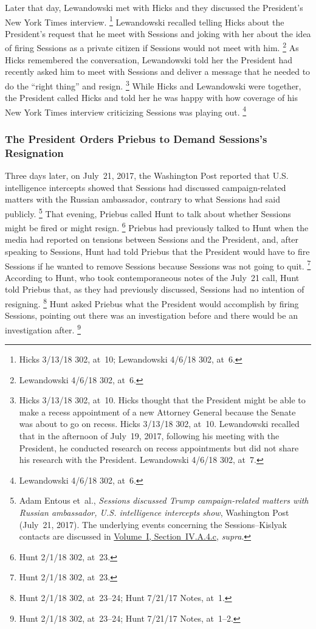 Later that day, Lewandowski met with Hicks and they discussed the President's New York Times interview.%
\footnote{Hicks 3/13/18 302, at~10;
Lewandowski 4/6/18 302, at~6.}
Lewandowski recalled telling Hicks about the President's request that he meet with Sessions and joking with her about the idea of firing Sessions as a private citizen if Sessions would not meet with him.%
\footnote{Lewandowski 4/6/18 302, at~6.}
As Hicks remembered the conversation, Lewandowski told her the President had recently asked him to meet with Sessions and deliver a message that he needed to do the ``right thing'' and resign.%
\footnote{Hicks 3/13/18 302, at~10.
Hicks thought that the President might be able to make a recess appointment of a new Attorney General because the Senate was about to go on recess.
Hicks 3/13/18 302, at~10.
Lewandowski recalled that in the afternoon of July~19, 2017, following his meeting with the President, he conducted research on recess appointments but did not share his research with the President.
Lewandowski 4/6/18 302, at~7.}
While Hicks and Lewandowski were together, the President called Hicks and told her he was happy with how coverage of his New York Times interview criticizing Sessions was playing out.%
\footnote{Lewandowski 4/6/18 302, at~6.}

\subsubsection{The President Orders Priebus to Demand Sessions's Resignation}

Three days later, on July~21, 2017, the Washington Post reported that U.S. intelligence intercepts showed that Sessions had discussed campaign-related matters with the Russian ambassador, contrary to what Sessions had said publicly.%
\footnote{Adam Entous et~al., \textit{Sessions discussed Trump campaign-related matters with Russian ambassador, U.S. intelligence intercepts show}, Washington Post (July~21, 2017).
The underlying events concerning the Sessions--Kislyak contacts are discussed in \hyperlink{paragraph.1.4.1.4.3}{Volume~I, Section~IV.A.4.c}, \textit{supra}.}
That evening, Priebus called Hunt to talk about whether Sessions might be fired or might resign.%
\footnote{Hunt 2/1/18 302, at~23.}
Priebus had previously talked to Hunt when the media had reported on tensions between Sessions and the President, and, after speaking to Sessions, Hunt had told Priebus that the President would have to fire Sessions if he wanted to remove Sessions because Sessions was not going to quit.%
\footnote{Hunt 2/1/18 302, at~23.}
According to Hunt, who took contemporaneous notes of the July~21 call, Hunt told Priebus that, as they had previously discussed, Sessions had no intention of resigning.%
\footnote{Hunt 2/1/18 302, at~23--24;
Hunt 7/21/17 Notes, at~1.}
Hunt asked Priebus what the President would accomplish by firing Sessions, pointing out there was an investigation before and there would be an investigation after.%
\footnote{Hunt 2/1/18 302, at~23--24;
Hunt 7/21/17 Notes, at~1--2.}


